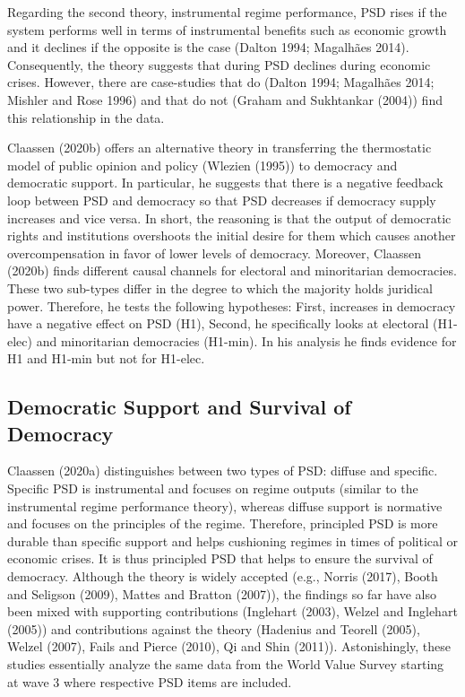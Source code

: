 \documentclass[12pt,english,a4paper,oneside]{article}
\theoremstyle{definition}
\theoremstyle{definition}
\theoremstyle{definition}
\theoremstyle{definition}
\theoremstyle{remark}
\begin{document}
Regarding the second theory, instrumental regime performance, PSD rises if the system performs well in terms of instrumental benefits such as economic growth and it declines if the opposite is the case (Dalton 1994; Magalhães 2014). Consequently, the theory suggests that during PSD declines during economic crises. However, there are case-studies that do (Dalton 1994; Magalhães 2014; Mishler and Rose 1996) and that do not (Graham and Sukhtankar (2004)) find this relationship in the data.

Claassen (2020b) offers an alternative theory in transferring the thermostatic model of public opinion and policy (Wlezien (1995)) to democracy and democratic support. In particular, he suggests that there is a negative feedback loop between PSD and democracy so that PSD decreases if democracy supply increases and vice versa. In short, the reasoning is that the output of democratic rights and institutions overshoots the initial desire for them which causes another overcompensation in favor of lower levels of democracy. Moreover, Claassen (2020b) finds different causal channels for electoral and minoritarian democracies. These two sub-types differ in the degree to which the majority holds juridical power. Therefore, he tests the following hypotheses: First, increases in democracy have a negative effect on PSD (H1), Second, he specifically looks at electoral (H1-elec) and minoritarian democracies (H1-min). In his analysis he finds evidence for H1 and H1-min but not for H1-elec.

\hypertarget{democratic-support-and-survival-of-democracy}{%
\subsection{Democratic Support and Survival of Democracy}\label{democratic-support-and-survival-of-democracy}}

Claassen (2020a) distinguishes between two types of PSD: diffuse and specific. Specific PSD is instrumental and focuses on regime outputs (similar to the instrumental regime performance theory), whereas diffuse support is normative and focuses on the principles of the regime. Therefore, principled PSD is more durable than specific support and helps cushioning regimes in times of political or economic crises. It is thus principled PSD that helps to ensure the survival of democracy. Although the theory is widely accepted (e.g., Norris (2017), Booth and Seligson (2009), Mattes and Bratton (2007)), the findings so far have also been mixed with supporting contributions (Inglehart (2003), Welzel and Inglehart (2005)) and contributions against the theory (Hadenius and Teorell (2005), Welzel (2007), Fails and Pierce (2010), Qi and Shin (2011)). Astonishingly, these studies essentially analyze the same data from the World Value Survey starting at wave 3 where respective PSD items are included.
\end{document}
